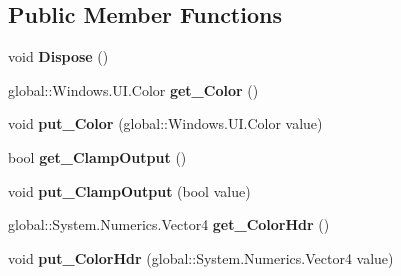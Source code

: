 \subsection*{Public Member Functions}
\begin{DoxyCompactItemize}
\item 
\mbox{\label{class_microsoft_1_1_graphics_1_1_canvas_1_1_effects_1_1_tint_effect_ab057d395ffb4168e2e95ebdec2027f4f}} 
void {\bfseries Dispose} ()
\item 
\mbox{\label{class_microsoft_1_1_graphics_1_1_canvas_1_1_effects_1_1_tint_effect_a0286d78ccbae82990f13233219282806}} 
global\+::\+Windows.\+U\+I.\+Color {\bfseries get\+\_\+\+Color} ()
\item 
\mbox{\label{class_microsoft_1_1_graphics_1_1_canvas_1_1_effects_1_1_tint_effect_a080d65333257b075792ecc37d5b545c9}} 
void {\bfseries put\+\_\+\+Color} (global\+::\+Windows.\+U\+I.\+Color value)
\item 
\mbox{\label{class_microsoft_1_1_graphics_1_1_canvas_1_1_effects_1_1_tint_effect_a26fe14bbdea4256df42b059f96b801f2}} 
bool {\bfseries get\+\_\+\+Clamp\+Output} ()
\item 
\mbox{\label{class_microsoft_1_1_graphics_1_1_canvas_1_1_effects_1_1_tint_effect_a762a787f9d5c2379ffa4beb693095aa3}} 
void {\bfseries put\+\_\+\+Clamp\+Output} (bool value)
\item 
\mbox{\label{class_microsoft_1_1_graphics_1_1_canvas_1_1_effects_1_1_tint_effect_a891fdb54c303baa977b1404d8e95d6a6}} 
global\+::\+System.\+Numerics.\+Vector4 {\bfseries get\+\_\+\+Color\+Hdr} ()
\item 
\mbox{\label{class_microsoft_1_1_graphics_1_1_canvas_1_1_effects_1_1_tint_effect_a755aa3dff5affa0462452b38f7531724}} 
void {\bfseries put\+\_\+\+Color\+Hdr} (global\+::\+System.\+Numerics.\+Vector4 value)

\end{DoxyCompactItemize}
